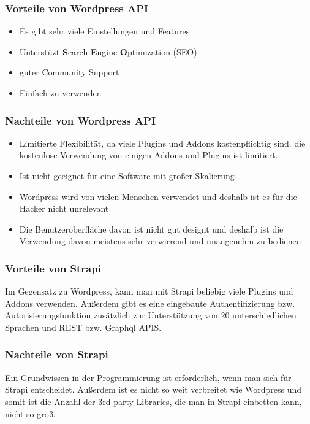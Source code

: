 \begin{spacing}{1}
    \subsubsection{Vorteile von Wordpress API}

    \begin{itemize}
        \item Es gibt sehr viele Einstellungen und Features
        \item Unterstüzt \textbf{S}earch \textbf{E}ngine \textbf{O}ptimization (SEO)
        \item guter Community Support
        \item Einfach zu verwenden
    \end{itemize}
    \cite{strapi-vs-wordpress}

    \subsubsection{Nachteile von Wordpress API}
    \begin{itemize}
        \item  Limitierte Flexibilität, da viele Plugins und Addons kostenpflichtig sind.
              die kostenlose Verwendung von einigen Addons und Plugins ist limitiert.
        \item Ist nicht geeignet für eine Software mit großer Skalierung
        \item Wordpress wird von vielen Menschen verwendet und deshalb ist es für die Hacker nicht unrelevant
        \item Die Benutzeroberfläche davon ist nicht gut designt und deshalb ist die Verwendung davon meistens sehr verwirrend und unangenehm zu bedienen
    \end{itemize}
    \cite{strapi-vs-wordpress}

    \subsubsection{Vorteile von Strapi}

    Im Gegensatz zu Wordpress, kann man mit Strapi beliebig viele Plugins und Addons
    verwenden. Außerdem gibt es eine eingebaute Authentifizierung bzw. Autorisierungsfunktion
    zusätzlich zur Unterstützung von 20 unterschiedlichen Sprachen und REST
    bzw. Graphql APIS.
    \cite{strapi-vs-wordpress}

    \subsubsection{Nachteile von Strapi}
    Ein Grundwissen in der Programmierung ist erforderlich, wenn man sich für Strapi
    entscheidet. Außerdem ist es nicht so weit verbreitet wie Wordpress und somit ist die Anzahl
    der 3rd-party-Libraries, die man in Strapi einbetten kann, nicht so groß.
    \cite{strapi-vs-wordpress}


\end{spacing}
